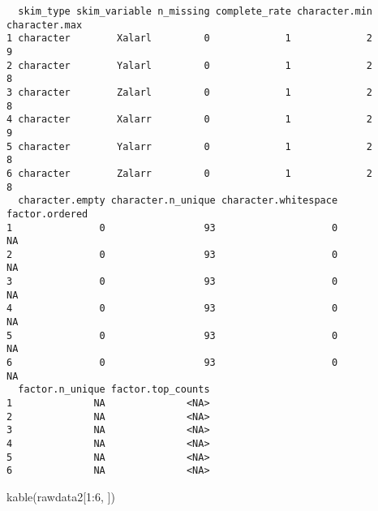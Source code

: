 \documentclass[
  letterpaper,
  DIV=11,
  numbers=noendperiod]{scrartcl}
\newenvironment{Shaded}{\begin{snugshade}}{\end{snugshade}}
\newcommand{\DecValTok}[1]{\textcolor[rgb]{0.68,0.00,0.00}{#1}}
\newcommand{\FunctionTok}[1]{\textcolor[rgb]{0.28,0.35,0.67}{#1}}
\newcommand{\NormalTok}[1]{\textcolor[rgb]{0.00,0.23,0.31}{#1}}
\newcommand{\SpecialCharTok}[1]{\textcolor[rgb]{0.37,0.37,0.37}{#1}}
\begin{document}
\begin{verbatim}
  skim_type skim_variable n_missing complete_rate character.min character.max
1 character        Xalarl         0             1             2             9
2 character        Yalarl         0             1             2             8
3 character        Zalarl         0             1             2             8
4 character        Xalarr         0             1             2             9
5 character        Yalarr         0             1             2             8
6 character        Zalarr         0             1             2             8
  character.empty character.n_unique character.whitespace factor.ordered
1               0                 93                    0             NA
2               0                 93                    0             NA
3               0                 93                    0             NA
4               0                 93                    0             NA
5               0                 93                    0             NA
6               0                 93                    0             NA
  factor.n_unique factor.top_counts
1              NA              <NA>
2              NA              <NA>
3              NA              <NA>
4              NA              <NA>
5              NA              <NA>
6              NA              <NA>
\end{verbatim}

\begin{Shaded}
\begin{Highlighting}[]
\FunctionTok{kable}\NormalTok{(rawdata2[}\DecValTok{1}\SpecialCharTok{:}\DecValTok{6}\NormalTok{, ])}
\end{Highlighting}
\end{Shaded}
\end{document}
